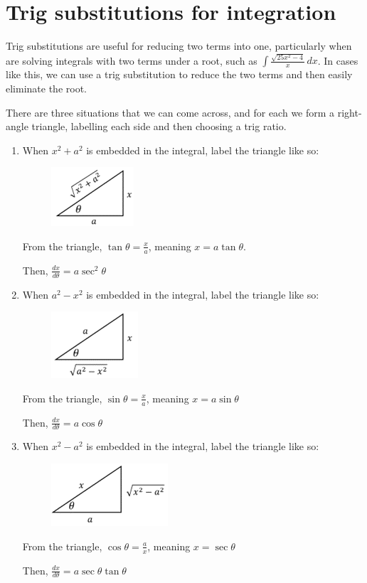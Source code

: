 \documentclass[../main.tex]{subfiles}
\begin{document}
\section{Trig substitutions for integration}
Trig substitutions are useful for reducing two terms into one, particularly when are solving integrals with two terms under a root, such as \(\int \frac{\sqrt{25x^2-4}}{x}\,dx\). In cases like this, we can use a trig substitution to reduce the two terms and then easily eliminate the root.

There are three situations that we can come across, and for each we form a right-angle triangle, labelling each side and then choosing a trig ratio.

\begin{enumerate}
    \item 
    When \(x^2+a^2\) is embedded in the integral, label the triangle like so:
    \begin{figure}[h]
        \centering
        \includegraphics{images/trigsub1.png}
    \end{figure}

    From the triangle, \(\tan{\theta}=\frac{x}{a}\), meaning \(x=a\tan{\theta}\).

    Then, \(\frac{dx}{d\theta}=a\sec^2{\theta}\)

    \item 
    When \(a^2-x^2\) is embedded in the integral, label the triangle like so:
    \begin{figure}[h]
        \centering
        \includegraphics{images/trigsub2.png}
    \end{figure}

    From the triangle, \(\sin{\theta}=\frac{x}{a}\), meaning \(x=a\sin{\theta}\)

    Then, \(\frac{dx}{d\theta}=a\cos{\theta}\)

    \item 
    When \(x^2-a^2\) is embedded in the integral, label the triangle like so:
    \begin{figure}[h]
        \centering
        \includegraphics{images/trigsub3.png}
    \end{figure}

    From the triangle, \(\cos{\theta}=\frac{a}{x}\), meaning \(x=\sec{\theta}\)

    Then, \(\frac{dx}{d\theta}=a\sec{\theta}\tan{\theta}\)
      
    \end{enumerate}
\end{document}
